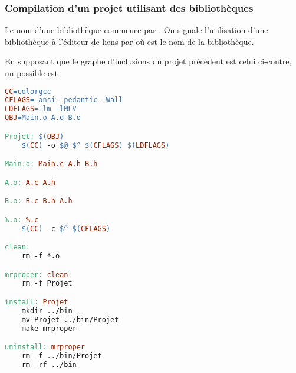 \begin{frame}[fragile]
\frametitle{Compilation d'un projet utilisant des bibliothèques}
Le nom d'une bibliothèque commence par . On signale l'utilisation
d'une bibliothèque à l'éditeur de liens par  où 
est le nom de la bibliothèque.

\begin{multicols}{2}
\footnotesize
En supposant que le graphe d'inclusions du projet précédent est celui
ci-contre, un  possible est
\begin{center}
\end{center}
\end{multicols}\vspace{-1.5em}
\begin{multicols}{2}
\begin{lstlisting}[language=make,basicstyle=\scriptsize\tt]
CC=colorgcc
CFLAGS=-ansi -pedantic -Wall
LDFLAGS=-lm -lMLV
OBJ=Main.o A.o B.o

Projet: $(OBJ)
    $(CC) -o $@ $^ $(CFLAGS) $(LDFLAGS)

Main.o: Main.c A.h B.h

A.o: A.c A.h

B.o: B.c B.h A.h

%.o: %.c
    $(CC) -c $^ $(CFLAGS)

clean:
    rm -f *.o

mrproper: clean
    rm -f Projet

install: Projet
    mkdir ../bin
    mv Projet ../bin/Projet
    make mrproper

uninstall: mrproper
    rm -f ../bin/Projet
    rm -rf ../bin
\end{lstlisting}
\begin{math}\end{math}
\end{multicols}
\end{frame}

